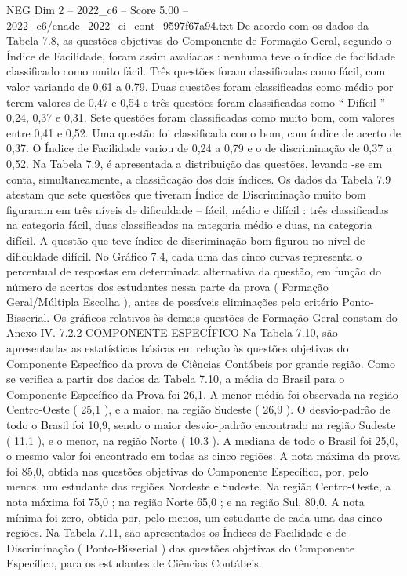 \begin{textsample}{NEG Dim 2 – 2022\_c6 – Score 5.00 – 2022\_c6/enade\_2022\_ci\_cont\_9597f67a94.txt}
De acordo com os dados da Tabela 7.8, as questões objetivas do Componente de Formação Geral, segundo o Índice de Facilidade, foram assim avaliadas : nenhuma teve o índice de facilidade classificado como muito fácil.
Três questões foram classificadas como fácil, com valor variando de 0,61 a 0,79.
Duas questões foram classificadas como médio por terem valores de 0,47 e 0,54 e três questões foram classificadas como “ Difícil ” 0,24, 0,37 e 0,31.
Sete questões foram classificadas como muito bom, com valores entre 0,41 e 0,52.
Uma questão foi classificada como bom, com índice de acerto de 0,37.
O Índice de Facilidade variou de 0,24 a 0,79 e o de discriminação de 0,37 a 0,52.
Na Tabela 7.9, é apresentada a distribuição das questões, levando -se em conta, simultaneamente, a classificação dos dois índices.
Os dados da Tabela 7.9 atestam que sete questões que tiveram Índice de Discriminação muito bom figuraram em três níveis de dificuldade – fácil, médio e difícil : três classificadas na categoria fácil, duas classificadas na categoria médio e duas, na categoria difícil.
A questão que teve índice de discriminação bom figurou no nível de dificuldade difícil.
No Gráfico 7.4, cada uma das cinco curvas representa o percentual de respostas em determinada alternativa da questão, em função do número de acertos dos estudantes nessa parte da prova ( Formação Geral/Múltipla Escolha ), antes de possíveis eliminações pelo critério Ponto-Bisserial.
Os gráficos relativos às demais questões de Formação Geral constam do Anexo IV. 7.2.2 COMPONENTE ESPECÍFICO Na Tabela 7.10, são apresentadas as estatísticas básicas em relação às questões objetivas do Componente Específico da prova de Ciências Contábeis por grande região.
Como se verifica a partir dos dados da Tabela 7.10, a média do Brasil para o Componente Específico da Prova foi 26,1.
A menor média foi observada na região Centro-Oeste ( 25,1 ), e a maior, na região Sudeste ( 26,9 ).
O desvio-padrão de todo o Brasil foi 10,9, sendo o maior desvio-padrão encontrado na região Sudeste ( 11,1 ), e o menor, na região Norte ( 10,3 ).
A mediana de todo o Brasil foi 25,0, o mesmo valor foi encontrado em todas as cinco regiões.
A nota máxima da prova foi 85,0, obtida nas questões objetivas do Componente Específico, por, pelo menos, um estudante das regiões Nordeste e Sudeste.
Na região Centro-Oeste, a nota máxima foi 75,0 ; na região Norte 65,0 ; e na região Sul, 80,0.
A nota mínima foi zero, obtida por, pelo menos, um estudante de cada uma das cinco regiões.
Na Tabela 7.11, são apresentados os Índices de Facilidade e de Discriminação ( Ponto-Bisserial ) das questões objetivas do Componente Específico, para os estudantes de Ciências Contábeis.

\end{textsample}
